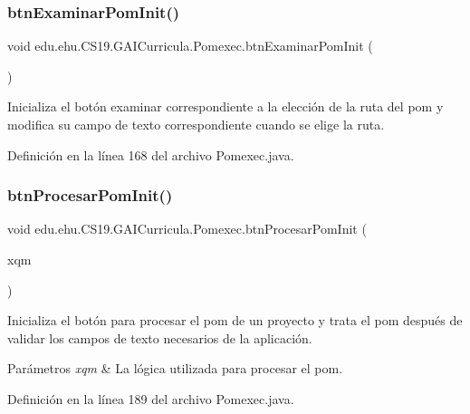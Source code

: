 \subsubsection{\texorpdfstring{btnExaminarPomInit()}{btnExaminarPomInit()}}
{\footnotesize\ttfamily void edu.\+ehu.\+C\+S19.\+G\+A\+I\+Curricula.\+Pomexec.\+btn\+Examinar\+Pom\+Init (\begin{DoxyParamCaption}{ }\end{DoxyParamCaption})}



Inicializa el botón examinar correspondiente a la elección de la ruta del pom y modifica su campo de texto correspondiente cuando se elige la ruta. 



Definición en la línea 168 del archivo Pomexec.\+java.

\mbox{\label{a00028_a9bc18b3b0b00c0c7cd1e2852abefd3aa}} 
\subsubsection{\texorpdfstring{btnProcesarPomInit()}{btnProcesarPomInit()}}
{\footnotesize\ttfamily void edu.\+ehu.\+C\+S19.\+G\+A\+I\+Curricula.\+Pomexec.\+btn\+Procesar\+Pom\+Init (\begin{DoxyParamCaption}\item[{\mbox{\hyperlink{a00032}{X\+Query\+Methods}}}]{xqm }\end{DoxyParamCaption})}



Inicializa el botón para procesar el pom de un proyecto y trata el pom después de validar los campos de texto necesarios de la aplicación. 


\begin{DoxyParams}{Parámetros}
{\em xqm} & La lógica utilizada para procesar el pom. \\
\hline
\end{DoxyParams}


Definición en la línea 189 del archivo Pomexec.\+java.

\mbox{\label{a00028_aea79b02cfc8fae015e78943e32710210}} 
